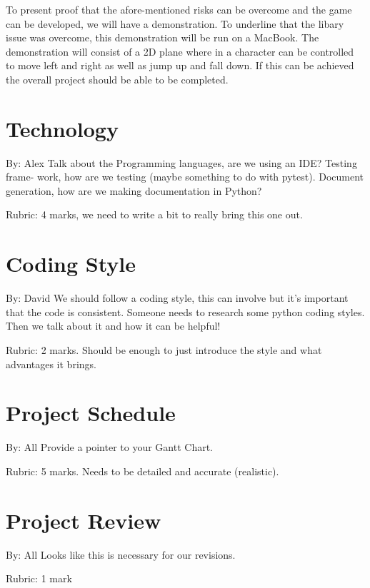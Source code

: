 \documentclass{article}
\begin{document}
To present proof that the afore-mentioned risks can be overcome and the game can
be developed, we will have a demonstration. To underline that the libary issue
was overcome, this demonstration will be run on a MacBook. The demonstration
will consist of a 2D plane where in a character can be controlled to move left
and right as well as jump up and fall down. If this can be achieved the overall project should be able to be completed.

\section{Technology}
By: Alex
Talk  about  the  Programming  languages,  are  we  using  an  IDE?  Testing
frame-
work,  how  are  we  testing  (maybe  something  to  do  with  pytest).
Document
generation, how are we making documentation in Python?

Rubric:  4 marks, we need to write a bit to really bring this one out.

\section{Coding Style}
By: David
We  should  follow  a  coding  style,  this  can  involve  but  it’s  important
 that  the
code is consistent.  Someone needs to research some python coding styles.  Then
we talk about it and how it can be helpful!

Rubric:  2  marks.   Should  be  enough  to  just  introduce  the  style  and
what
advantages it brings.

\section{Project Schedule}
By: All
Provide a pointer to your Gantt Chart.

Rubric:  5 marks.  Needs to be detailed and accurate (realistic).

\section{Project Review}
By: All
Looks like this is necessary for our revisions.

Rubric:  1 mark
\end{document}
